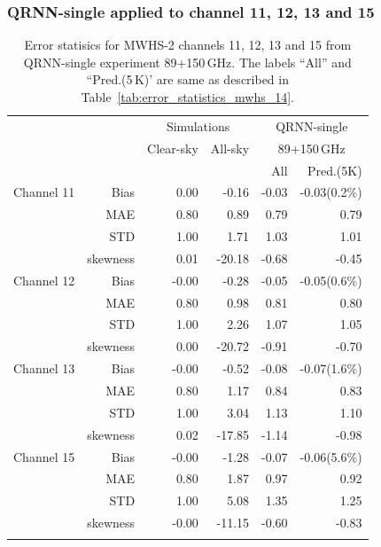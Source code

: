 \documentclass[amt, manuscript]{copernicus}
\begin{document}
\subsubsection{QRNN-single applied to channel 11, 12, 13 and 15}
\label{sec:mwhs_others}
\begin{table}[t]
	\caption{ Error statisics for MWHS-2 channels 11, 12, 13 and 15 from QRNN-single experiment 89+150\,GHz. The labels ``All'' and ``Pred.(5\,K)' are same as described in Table~\ref{tab:error_statistics_mwhs_14}.}
	\label{tab:error_statistics_mwhs_others}
	\begin{tabular}{lrrr|rr}
		\tophline
		&&\multicolumn{2}{c|}{Simulations}& \multicolumn{2}{c}{QRNN-single} \\
		\cline{2-6}
		& &  Clear-sky &   All-sky &  \multicolumn{2}{c}{89+150\,GHz}  \\
		&	&		   &			& All & Pred.(5K)\\
		\middlehline
		Channel 11  &   Bias      & 0.00 &  -0.16 & -0.03 & -0.03(0.2\%)  \\
				    &	MAE       & 0.80 &   0.89 &  0.79 &  0.79  \\
					&	STD       & 1.00 &   1.71 &  1.03 &  1.01  \\
					&	skewness & 0.01 & -20.18 & -0.68 & -0.45  \\
		\middlehline
		Channel 12  & Bias      & -0.00 &  -0.28 & -0.05 & -0.05(0.6\%)  \\
					& MAE       &  0.80 &   0.98 &  0.81 &  0.80  \\
					& STD       &  1.00 &   2.26 &  1.07 &  1.05  \\
					& skewness &  0.00 & -20.72 & -0.91 & -0.70  \\
		\middlehline
		Channel 13  & Bias      & -0.00 &  -0.52 & -0.08 & -0.07(1.6\%)  \\
					& MAE       &  0.80 &   1.17 &  0.84 &  0.83  \\
					& STD       &  1.00 &   3.04 &  1.13 &  1.10  \\
					& skewness &  0.02 & -17.85 & -1.14 & -0.98 \\		
		\middlehline
		Channel 15  & Bias      & -0.00 &  -1.28 & -0.07 & -0.06(5.6\%)  \\
					& MAE       &  0.80 &   1.87 &  0.97 &  0.92 \\
					& STD       &  1.00 &   5.08 &  1.35 &  1.25 \\
					& skewness & -0.00 & -11.15 & -0.60 & -0.83  \\ 
		\bottomhline
	\end{tabular}
\end{table}
\end{document}
